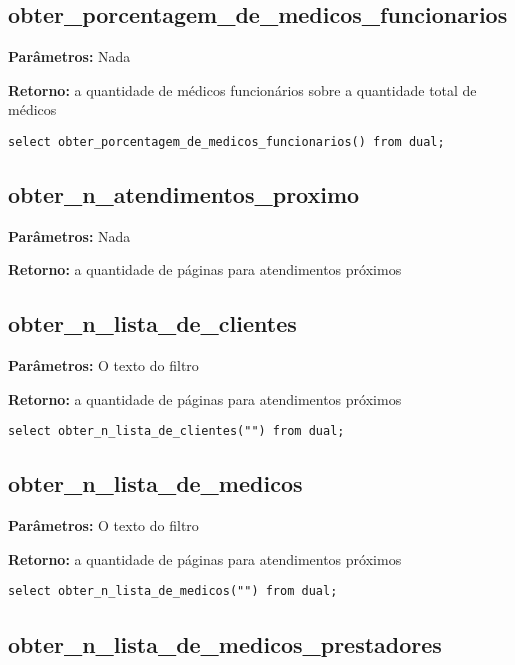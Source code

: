 \subsection{obter\_porcentagem\_de\_medicos\_funcionarios}

\textbf{Parâmetros:} Nada

\textbf{Retorno:} a quantidade de médicos funcionários sobre a quantidade total de médicos

\begin{verbatim}
select obter_porcentagem_de_medicos_funcionarios() from dual;
\end{verbatim}

\subsection{obter\_n\_atendimentos\_proximo}

\textbf{Parâmetros:} Nada

\textbf{Retorno:} a quantidade de páginas para atendimentos próximos


\subsection{obter\_n\_lista\_de\_clientes}

\textbf{Parâmetros:} O texto do filtro

\textbf{Retorno:} a quantidade de páginas para atendimentos próximos

\begin{verbatim}
select obter_n_lista_de_clientes("") from dual;
\end{verbatim}

\subsection{obter\_n\_lista\_de\_medicos}

\textbf{Parâmetros:} O texto do filtro

\textbf{Retorno:} a quantidade de páginas para atendimentos próximos

\begin{verbatim}
select obter_n_lista_de_medicos("") from dual;
\end{verbatim}

\subsection{obter\_n\_lista\_de\_medicos\_prestadores}

